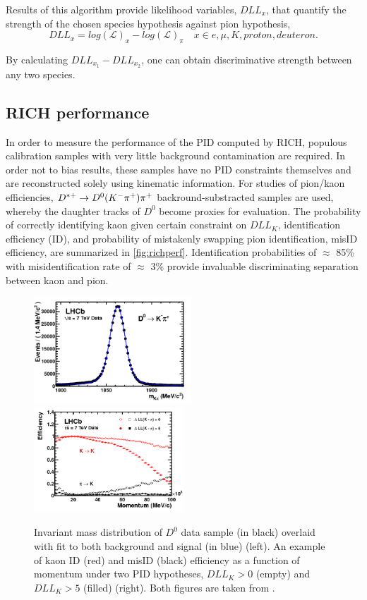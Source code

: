 Results of this algorithm provide likelihood variables, $DLL_{x}$, that quantify the strength of the chosen species hypothesis against pion hypothesis,
\begin{equation}
	DLL_{x} = log(\mathcal{L})_{x} - log(\mathcal{L})_{\pi} \quad  x\in{e, \mu, K, proton, deuteron}.
\end{equation}

By calculating $DLL_{x_{1}} - DLL_{x_{2}}$, one can obtain discriminative strength between any two species.

\subsection{RICH performance}
In order to measure the performance of the \Gls{PID} computed by RICH, populous calibration samples with very little background contamination are required. In order not to bias results, these samples have no \Gls{PID} constraints themselves and are reconstructed solely using kinematic information. For studies of pion/kaon efficiencies, $D^{*+} \rightarrow D^{0}({K}^{-}{{\pi}^+}){{\pi}^+}$ backround-substracted samples are used, whereby the daughter tracks of $D^{0}$ become proxies for evaluation. The probability of correctly identifying kaon given certain constraint on $DLL_{K}$, identification efficiency (\Gls{ID}), and probability of mistakenly swapping pion identification, \Gls{misID} efficiency, are summarized in \autoref{fig:richperf}. Identification probabilities of $\approx$ 85\% with misidentification rate of $\approx$ 3\% provide invaluable discriminating separation between kaon and pion.




\begin{figure}[!h]
	\centering
	\includegraphics[width = 0.525\textwidth]{figs/detector/D0mass.png}%
	\includegraphics[width = 0.5\textwidth]{figs/detector/RICHperfdata.png}%
	\caption{Invariant mass distribution of $D^{0}$ data sample (in black) overlaid with fit to both background and signal (in blue) (left). An example of kaon \Gls{ID} (red) and \Gls{misID} (black) efficiency as a function of momentum under two PID hypotheses, $DLL_{K} > 0$ (empty)  and $DLL_{K} > 5$ (filled) (right). Both figures are taken from \cite{LHCb-DP-2012-003}.}
	\label{fig:richperf}
\end{figure}


